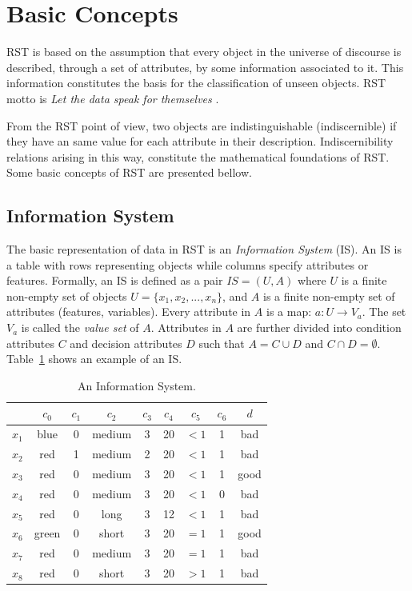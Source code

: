 \documentclass[authoryear,preprint,review,12pt]{elsarticle}
\begin{document}
\section{Basic Concepts}\label{basicConcepts}
  RST is based on the assumption that every object in the universe of discourse is described, through a 
  set of attributes, by some information associated to it. This information constitutes the basis for the
  classification of unseen objects. RST motto is \textit{Let the data speak for themselves} \citep{Tiwari14}.

  From the RST point of view, two objects are indistinguishable (indiscernible) if they have an same 
  value for each attribute in their description. Indiscernibility relations arising in this way, constitute the
  mathematical foundations of RST. 
  Some basic concepts of RST are presented bellow.
  
\subsection{Information System}
  The basic representation of data in RST is an \emph{Information System} (IS). An IS is a table with rows
  representing objects while columns specify attributes or features. Formally, an IS is defined as a pair
  $IS=(U,A)$ where $U$ is a finite non-empty set of objects $U=\lbrace x_1,x_2,...,x_n\rbrace$, and $A$ is a 
  finite non-empty set
  of attributes (features, variables). Every attribute in $A$ is a map: $a: U \rightarrow V_a$. The set $V_a$ is
  called the \textit{value set} of $A$. Attributes in $A$ are further divided into condition attributes $C$ and 
  decision attributes $D$ such that $A=C \cup D$ and $C \cap D =\emptyset$. 
  Table~\ref{tab_IS} shows an example of an IS.
  
 \begin{table}[htb]
		\caption{An Information System.} \label{tab_IS}
		\centering
 	\begin{tabular}{c||c|c|c|c|c|c|c||c}
 			  & $c_0$ & $c_1$ & $c_2$ &  $c_3$ & $c_4$ & $c_5$ &  $c_6$ & $d$ \\
 		\hline \hline
		$x_1$ &   blue  & 0 & medium & 3 & 20 & $<1$  & 1 & bad   \\
		$x_2$ &   red   & 1 & medium & 2 & 20 & $<1$  & 1 & bad   \\
		$x_3$ &   red   & 0 & medium & 3 & 20 & $<1$  & 1 & good   \\
		$x_4$ &   red   & 0 & medium & 3 & 20 & $<1$  & 0 & bad   \\
		$x_5$ &   red   & 0 & long   & 3 & 12 & $<1$  & 1 & bad   \\
		$x_6$ &   green & 0 & short  & 3 & 20 & $=1$  & 1 & good   \\
		$x_7$ &   red   & 0 & medium & 3 & 20 & $=1$  & 1 & bad   \\
		$x_8$ &   red   & 0 & short  & 3 & 20 & $>1$  & 1 & bad   \\
 	\end{tabular}             
 \end{table}
 
\end{document}
